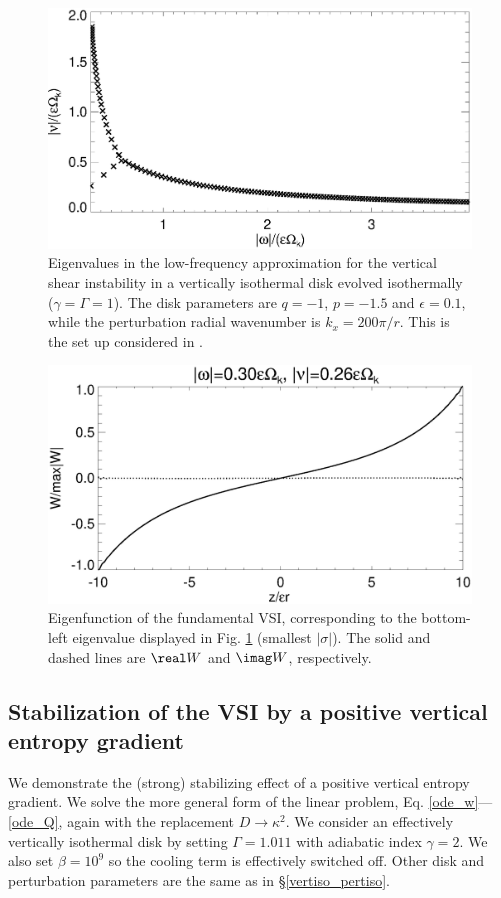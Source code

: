 \begin{figure}
  \includegraphics[width=\linewidth]{figures/eigenvalues_iso}
  \caption{Eigenvalues in the low-frequency approximation for the
    vertical shear instability in a vertically isothermal disk evolved
    isothermally ($\gamma=\Gamma=1$). The disk parameters are $q=-1$,
    $p=-1.5$ and $\epsilon=0.1$, while the perturbation radial
    wavenumber is $k_x=200\pi/r$. This is the set up considered in
    \cite{mcnally14}. \label{lowfreq_eigen}
  }
\end{figure}

\begin{figure}
  \includegraphics[width=\linewidth]{figures/eigenvector_iso}
  \caption{Eigenfunction of the fundamental VSI,
    corresponding to the bottom-left eigenvalue displayed in
    Fig. \ref{lowfreq_eigen} (smallest $|\sigma|$). The
    solid and dashed lines are $\real W$ and $\imag W$, respectively. 
    \label{lowfreq_eigenfunc}
  }
\end{figure}

\subsection{Stabilization of the VSI by a positive vertical entropy
  gradient}
We demonstrate the (strong) stabilizing effect of a  
positive vertical entropy gradient. We solve the more general form of
the linear problem, Eq. \ref{ode_w}---\ref{ode_Q}, again with the
replacement $D\to\kappa^2$. We consider an effectively vertically
isothermal disk by setting $\Gamma=1.011$ with adiabatic index
$\gamma=2$. We also set $\beta=10^9$ so the cooling term is
effectively switched off. Other disk and perturbation parameters are
the same as in \S\ref{vertiso_pertiso}. 

